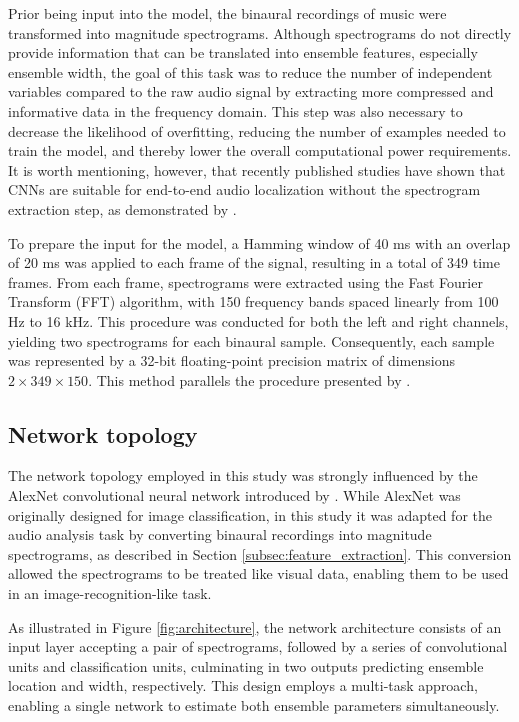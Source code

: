 \documentclass[11pt]{article}
\begin{document}
Prior being input into the model, the binaural recordings of music were transformed into magnitude spectrograms. Although spectrograms do not directly provide information that can be translated into ensemble features, especially ensemble width, the goal of this task was to reduce the number of independent variables compared to the raw audio signal by extracting more compressed and informative data in the frequency domain. This step was also necessary to decrease the likelihood of overfitting, reducing the number of examples needed to train the model, and thereby lower the overall computational power requirements. It is worth mentioning, however, that recently published studies have shown that CNNs are suitable for end-to-end audio localization without the spectrogram extraction step, as demonstrated by \textcite{vera-diaz_towards_2018, vecchiotti_end--end_2019}.

To prepare the input for the model, a Hamming window of 40 ms with an overlap of 20 ms was applied to each frame of the signal, resulting in a total of 349 time frames. From each frame, spectrograms were extracted using the Fast Fourier Transform (FFT) algorithm, with 150 frequency bands spaced linearly from 100 Hz to 16 kHz. This procedure was conducted for both the left and right channels, yielding two spectrograms for each binaural sample. Consequently, each sample was represented by a 32-bit floating-point precision matrix of dimensions $2 \times 349 \times 150$. This method parallels the procedure presented by \textcite{zielinski_automatic_2022}.

\subsection{Network topology}
\label{subsec:topology}

The network topology employed in this study was strongly influenced by the AlexNet convolutional neural network introduced by \textcite{krizhevsky_imagenet_2012}. While AlexNet was originally designed for image classification, in this study it was adapted for the audio analysis task by converting binaural recordings into magnitude spectrograms, as described in Section \ref{subsec:feature_extraction}. This conversion allowed the spectrograms to be treated like visual data, enabling them to be used in an image-recognition-like task.

As illustrated in Figure \ref{fig:architecture}, the network architecture consists of an input layer accepting a pair of spectrograms, followed by a series of convolutional units and classification units, culminating in two outputs predicting ensemble location and width, respectively. This design employs a multi-task approach, enabling a single network to estimate both ensemble parameters simultaneously.
\end{document}
